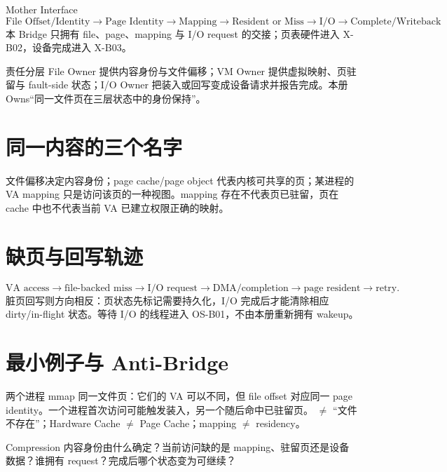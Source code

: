 \documentclass[UTF8,fontset=none,11pt,a4paper]{ctexart}
\begin{document}
\begin{corebox}{Mother Interface}
\[
\boxed{\text{File Offset/Identity}\to\text{Page Identity}\to\text{Mapping}\to\text{Resident or Miss}\to\text{I/O}\to\text{Complete/Writeback}}
\]
本 Bridge 只拥有 file、page、mapping 与 I/O request 的交接；页表硬件进入 X-B02，设备完成进入 X-B03。
\end{corebox}
\begin{methodbox}{责任分层}
File Owner 提供内容身份与文件偏移；VM Owner 提供虚拟映射、页驻留与 fault-side 状态；I/O Owner 把装入或回写变成设备请求并报告完成。本册 Owns“同一文件页在三层状态中的身份保持”。
\end{methodbox}
\section{同一内容的三个名字}
文件偏移决定内容身份；page cache/page object 代表内核可共享的页；某进程的 VA mapping 只是访问该页的一种视图。mapping 存在不代表页已驻留，页在 cache 中也不代表当前 VA 已建立权限正确的映射。
\section{缺页与回写轨迹}
\[
\text{VA access}\to\text{file-backed miss}\to\text{I/O request}\to\text{DMA/completion}\to\text{page resident}\to\text{retry}.
\]
脏页回写则方向相反：页状态先标记需要持久化，I/O 完成后才能清除相应 dirty/in-flight 状态。等待 I/O 的线程进入 OS-B01，不由本册重新拥有 wakeup。
\section{最小例子与 Anti-Bridge}
两个进程 mmap 同一文件页：它们的 VA 可以不同，但 file offset 对应同一 page identity。一个进程首次访问可能触发装入，另一个随后命中已驻留页。 $\neq$ “文件不存在”；Hardware Cache $\neq$ Page Cache；mapping $\neq$ residency。
\begin{corebox}{Compression}
内容身份由什么确定？当前访问缺的是 mapping、驻留页还是设备数据？谁拥有 request？完成后哪个状态变为可继续？
\end{corebox}
\end{document}
